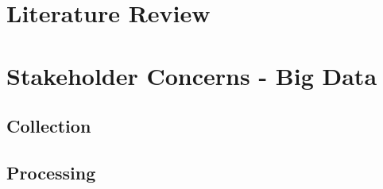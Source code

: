\documentclass[12pt]{article} %
\begin{document}
		
	\section{Literature Review}
	
	
	
	
	
	
	
	\section{Stakeholder Concerns - Big Data}
	
	
	
	\subsection{Collection}
	
	
	
	
	\subsection{Processing}
	
\end{document}
